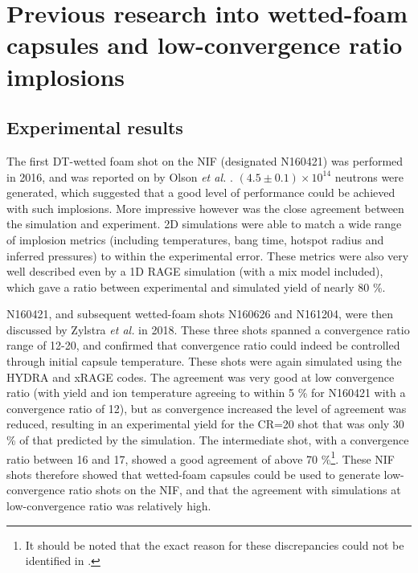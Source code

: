 \section{Previous research into wetted-foam capsules and low-convergence ratio implosions} \label{sec: PreviousLowCRResults}

\subsection{Experimental results}

The first DT-wetted foam shot on the NIF (designated N160421) was performed in 2016, and was reported on by Olson \textit{et al.} \cite{Olson2016}. $(4.5 \pm 0.1) \times 10^{14}$ neutrons were generated, which suggested that a good level of performance could be achieved with such implosions. More impressive however was the close agreement between the simulation and experiment. 2D simulations were able to match a wide range of implosion metrics (including temperatures, bang time, hotspot radius and inferred pressures) to within the experimental error. These metrics were also very well described even by a 1D RAGE simulation (with a mix model included), which gave a ratio between experimental and simulated yield of nearly 80 \%. 

N160421, and subsequent wetted-foam shots N160626 and N161204, were then discussed by Zylstra \textit{et al.} \cite{Zylstra2018} in 2018. These three shots spanned a convergence ratio range of 12-20, and confirmed that convergence ratio could indeed be controlled through initial capsule temperature. These shots were again simulated using the HYDRA and xRAGE codes. The agreement was very good at low convergence ratio (with yield and ion temperature agreeing to within 5 \% for N160421 with a convergence ratio of 12), but as convergence increased the level of agreement was reduced, resulting in an experimental yield for the CR=20 shot that was only 30 \% of that predicted by the simulation. The intermediate shot, with a convergence ratio between 16 and 17, showed a good agreement of above 70 \%\footnote{It should be noted that the exact reason for these discrepancies could not be identified in \cite{Zylstra2018}.}. These NIF shots therefore showed that wetted-foam capsules could be used to generate low-convergence ratio shots on the NIF, and that the agreement with simulations at low-convergence ratio was relatively high.

